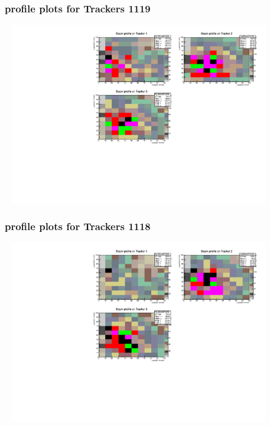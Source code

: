 \documentclass[slidestop,compress,mathserif]{beamer}
\begin{document}
\begin{frame}\frametitle{profile plots for Trackers 1119}
	 \includegraphics[width=12cm,height=8cm]{profile_plots_for_Trackers_1119.pdf}
\end{frame}
\begin{frame}\frametitle{profile plots for Trackers 1118}
	 \includegraphics[width=12cm,height=8cm]{profile_plots_for_Trackers_1118.pdf}
\end{frame}
\end{document}
